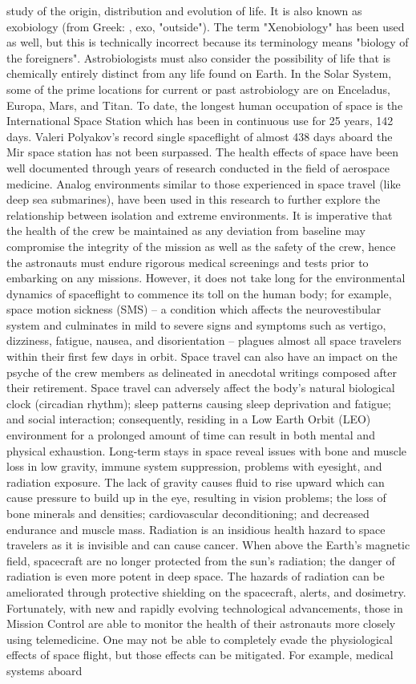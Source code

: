 \documentclass[12pt]{article}
\begin{document}
study of the origin, distribution and evolution of life. It is also known as exobiology (from Greek: , exo, "outside"). The term "Xenobiology" has been used as well, but this is technically incorrect because its terminology means "biology of the foreigners". Astrobiologists must also consider the possibility of life that is chemically entirely distinct from any life found on Earth. In the Solar System, some of the prime locations for current or past astrobiology are on Enceladus, Europa, Mars, and Titan. To date, the longest human occupation of space is the International Space Station which has been in continuous use for 25 years, 142 days. Valeri Polyakov's record single spaceflight of almost 438 days aboard the Mir space station has not been surpassed. The health effects of space have been well documented through years of research conducted in the field of aerospace medicine. Analog environments similar to those experienced in space travel (like deep sea submarines), have been used in this research to further explore the relationship between isolation and extreme environments. It is imperative that the health of the crew be maintained as any deviation from baseline may compromise the integrity of the mission as well as the safety of the crew, hence the astronauts must endure rigorous medical screenings and tests prior to embarking on any missions. However, it does not take long for the environmental dynamics of spaceflight to commence its toll on the human body; for example, space motion sickness (SMS) – a condition which affects the neurovestibular system and culminates in mild to severe signs and symptoms such as vertigo, dizziness, fatigue, nausea, and disorientation – plagues almost all space travelers within their first few days in orbit. Space travel can also have an impact on the psyche of the crew members as delineated in anecdotal writings composed after their retirement. Space travel can adversely affect the body's natural biological clock (circadian rhythm); sleep patterns causing sleep deprivation and fatigue; and social interaction; consequently, residing in a Low Earth Orbit (LEO) environment for a prolonged amount of time can result in both mental and physical exhaustion. Long-term stays in space reveal issues with bone and muscle loss in low gravity, immune system suppression, problems with eyesight, and radiation exposure. The lack of gravity causes fluid to rise upward which can cause pressure to build up in the eye, resulting in vision problems; the loss of bone minerals and densities; cardiovascular deconditioning; and decreased endurance and muscle mass. Radiation is an insidious health hazard to space travelers as it is invisible and can cause cancer. When above the Earth's magnetic field, spacecraft are no longer protected from the sun's radiation; the danger of radiation is even more potent in deep space. The hazards of radiation can be ameliorated through protective shielding on the spacecraft, alerts, and dosimetry. Fortunately, with new and rapidly evolving technological advancements, those in Mission Control are able to monitor the health of their astronauts more closely using telemedicine. One may not be able to completely evade the physiological effects of space flight, but those effects can be mitigated. For example, medical systems aboard 
\end{document}
